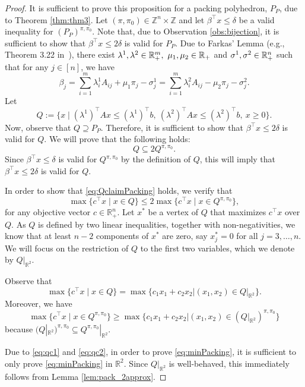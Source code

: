 \documentclass[11pt]{article}
\newcommand{\Z}{\mathbb{Z}}
\newcommand{\R}{\mathbb{R}}
\newcommand{\bpar}{\beta}
\newcommand{\cred}{\color{black}}
\begin{document}
\begin{proof}
It is sufficient to prove this proposition for a packing polyhedron, $P_P$, due to Theorem \ref{thm:thm3}.
Let $(\pi,\pi_0) \in \Z^n \times \Z$ and let $\bpar^\top x \leq \delta$ be a valid inequality for $(P_P)^{\pi,\pi_0}$. Note that, due to Observation \ref{obs:bijection}, it is sufficient to show that $\bpar^\top x \leq 2 \delta$ is valid for $P_P$. Due to Farkas' Lemma {\cred (e.g., Theorem 3.22 in~\cite{ConCorZam14b})}, there exist ${\cred \lambda^1, \lambda^2} \in \R_+^m, \ {\cred \mu_1, \mu_2 \in \R_+}$ and ${\cred \sigma^1, \sigma^2} \in \R_+^n$ such that for any $j \in [n]$, we have
$$\bpar_j  = \sum_{i=1}^m \lambda^1_i A_{ij} + \mu_1 \pi_j - \sigma^1_j = \sum_{i=1}^m \lambda^2_i A_{ij} - \mu_2 \pi_j - \sigma^2_j.$$
Let
$$Q := \{ x \mid (\lambda^1)^\top Ax \leq (\lambda^1)^\top b, ~ (\lambda^2)^\top Ax \leq (\lambda^2)^\top b,  ~ x \geq 0\}.$$
Now, observe that $Q \supseteq P_P$. Therefore, it is sufficient to show that $\bpar^\top x \leq 2 \delta$ is valid for $Q$. We will prove that the following holds:
\begin{equation}
\label{eq:QclaimPacking}
Q \subseteq 2 Q^{\pi,\pi_0}.
\end{equation}
Since $\bpar^\top x \leq \delta$ is valid for $Q^{\pi,\pi_0}$ by the definition of $Q$, this will imply that  $\bpar^\top x \leq 2 \delta$ is valid for $Q$.

In order to show that \eqref{eq:QclaimPacking} holds, we verify that 
\begin{equation}
\label{eq:minPacking}
\max \{ c^\top x \mid x \in Q\} \leq 2 \max \{ c^\top x \mid x \in Q^{\pi,\pi_0} \},
\end{equation}
for any objective vector $c \in \R_+^n$. Let $x^*$ be a vertex of $Q$ that maximizes $c^\top x$ over $Q$. As $Q$ is defined by two linear inequalities, together with non-negativities, we know that at least $n-2$ components of $x^*$ are zero, say $x^*_j = 0$ for all $j=3,\hdots,n$. We will focus on the restriction of $Q$ to the first two variables, which we denote by $Q |_{\R^2}$. 

Observe that 
\begin{equation}
\label{eq:qc1}
\max \{ c^\top x \mid x \in Q\} = \max \{ c_1 x_1 + c_2 x_2 | (x_1,x_2) \in Q |_{\R^2} \}.
\end{equation}
Moreover, we have
\begin{equation}
\label{eq:qc2}
\max \{ c^\top x \mid x \in Q^{\pi,\pi_0} \} \geq \max \{ c_1 x_1 + c_2 x_2 | (x_1,x_2) \in (Q |_{\R^2})^{\pi,\pi_0} \} 
\end{equation}
because {\cred $(Q |_{\R^2})^{\pi,\pi_0} \subseteq Q^{\pi,\pi_0} |_{\R^2}$.} %

Due to \eqref{eq:qc1} and \eqref{eq:qc2}, in order to prove \eqref{eq:minPacking}, it is sufficient to only prove \eqref{eq:minPacking} in $\R^2$. Since $Q |_{\R^2}$ is well-behaved, this immediately follows from Lemma \ref{lem:pack_2approx}.
\end{proof}
\end{document}
